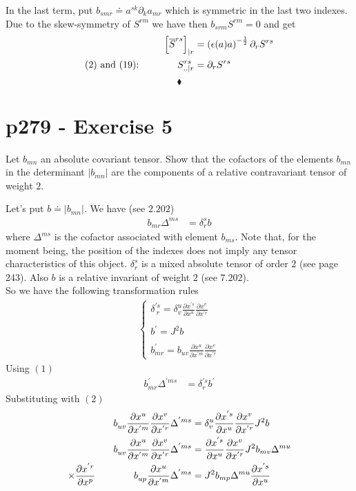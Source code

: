 In the last term, put $b_{smr}\doteq a^{sk}\partial_k a_{mr}$ which is symmetric in the last two indexes. Due to the skew-symmetry of $S^{rm}$ we have then $b_{srm}S^{rm}=0$ and get
\begin{align}
\left[\overline{S}^{rs} \right]_{|r}&=\left(\epsilon (a) a\right)^{-\frac{1}{2}}\partial_r S^{rs}\\
\text{(2) and (19):} \quad\quad\quad\quad S^{rs}_{..|r}&=\partial_r S^{rs}
\end{align} 
$$\blacklozenge$$
\newpage


\section{p279 - Exercise 5}
\begin{tcolorbox}
Let $b_{mn}$ an absolute covariant tensor. Show that the cofactors of the elements $b_{mn}$ in the determinant $\left|b_{mn}\right|$ are the components of a relative contravariant tensor of weight $2$.
\end{tcolorbox}
Let's put $b \doteq \left|b_{mn}\right|$. We have (see $\mathbf{2.202}$)
\begin{align}
b_{mr}\Delta^{ms}&=\delta^s_r b
\end{align}
where $\Delta^{ms}$ is the cofactor associated with element $b_{ms}$. Note that, for the moment being, the position of the indexes does not imply any tensor characteristics of this object.
$\delta^s_r$ is a mixed absolute tensor of order 2 (see page 243).
Also $b$ is a relative invariant of weight $2$ (see $\mathbf{7.202}$).\\
So we have the following transformation rules
\begin{align}
\left\{\begin{array}{l}
\delta^{'s}_{\ r} =  \delta^{u}_v \frac{\partial x^{'s} }{\partial {x^u}}\frac{\partial x^{v} }{\partial x^{'r}}\\\\
b^{'}= J^2 b\\\\
b^{'}_{mr} = b^{}_{uv}\frac{\partial x^{u} }{\partial {x^{'m}}}\frac{\partial x^{v} }{\partial x^{'r}}
\end{array}\right.
\end{align}
Using $(1)$
\begin{align}
b^{'}_{mr}\Delta^{'ms}&=\delta^{'s}_r b^{'}
\end{align}
Substituting with $(2)$
\begin{align}
b^{}_{uv}\frac{\partial x^{u} }{\partial {x^{'m}}}\frac{\partial x^{v} }{\partial x^{'r}}\Delta^{'ms}&=\delta^{u}_v \frac{\partial x^{'s} }{\partial {x^u}}\frac{\partial x^{v} }{\partial x^{'r}} J^2 b\\
b^{}_{uv}\frac{\partial x^{u} }{\partial {x^{'m}}}\frac{\partial x^{v} }{\partial x^{'r}}\Delta^{'ms}&=\frac{\partial x^{'s} }{\partial {x^u}}\frac{\partial x^{v} }{\partial x^{'r}} J^2 b_{mv}\Delta^{mu}\\
\times \frac{\partial x^{'r} }{\partial x^{p}}\quad\quad\quad\quad b^{}_{up}\frac{\partial x^{u} }{\partial x^{'m}}\Delta^{'ms}&=J^2b_{mp}\Delta^{mu}\frac{\partial x^{'s} }{\partial {x^u}}  
\end{align}
